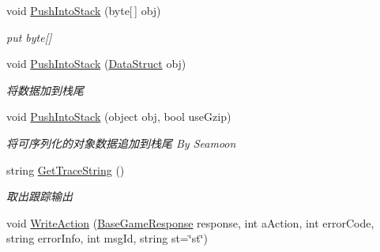 \begin{DoxyCompactItemize}
\item 
void \mbox{\hyperlink{class_t_net_1_1_service_1_1_data_struct_aba42f418f8c3deb925d6f8a4870450dd}{Push\+Into\+Stack}} (byte\mbox{[}$\,$\mbox{]} obj)
\begin{DoxyCompactList}\small\item\em put byte\mbox{[}\mbox{]} \end{DoxyCompactList}\item 
void \mbox{\hyperlink{class_t_net_1_1_service_1_1_data_struct_a160cbf76bcdd98ebcb936217aec441c6}{Push\+Into\+Stack}} (\mbox{\hyperlink{class_t_net_1_1_service_1_1_data_struct}{Data\+Struct}} obj)
\begin{DoxyCompactList}\small\item\em 将数据加到栈尾 \end{DoxyCompactList}\item 
void \mbox{\hyperlink{class_t_net_1_1_service_1_1_data_struct_a7d6e97c8b15213aff0e368a2a5e1f004}{Push\+Into\+Stack}} (object obj, bool use\+Gzip)
\begin{DoxyCompactList}\small\item\em 将可序列化的对象数据追加到栈尾 By Seamoon \end{DoxyCompactList}\item 
string \mbox{\hyperlink{class_t_net_1_1_service_1_1_data_struct_a15fc44e889c4924ff888acb4ce2e6efb}{Get\+Trace\+String}} ()
\begin{DoxyCompactList}\small\item\em 取出跟踪输出 \end{DoxyCompactList}\item 
void \mbox{\hyperlink{class_t_net_1_1_service_1_1_data_struct_a6b0fbbe86eca55bb56f966f0ed128470}{Write\+Action}} (\mbox{\hyperlink{class_t_net_1_1_service_1_1_base_game_response}{Base\+Game\+Response}} response, int a\+Action, int error\+Code, string error\+Info, int msg\+Id, string st=\char`\"{}st\char`\"{})
\end{DoxyCompactItemize}
